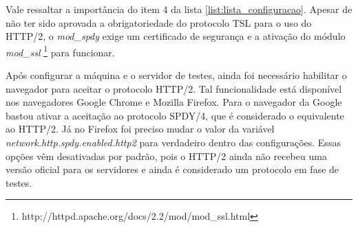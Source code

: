 Vale ressaltar a importância do item 4 da lista \autoref{list:lista_configuracao}. Apesar de não ter sido aprovada a obrigatoriedade do protocolo TSL para o uso do HTTP/2, o \textit{mod\_spdy} exige um certificado de segurança e a ativação do módulo \textit{mod\_ssl} \footnote{http://httpd.apache.org/docs/2.2/mod/mod\_ssl.html} para funcionar.

Após configurar a máquina e o servidor de testes, ainda foi necessário habilitar o navegador para aceitar o protocolo HTTP/2. Tal funcionalidade está disponível nos navegadores Google Chrome e Mozilla Firefox. Para o navegador da Google bastou ativar a aceitação ao protocolo SPDY/4, que é considerado o equivalente ao HTTP/2. Já no Firefox foi preciso mudar o valor da variável \textit{network.http.spdy.enabled.http2} para verdadeiro dentro das configurações. Essas opções vêm desativadas por padrão, pois o HTTP/2 ainda não recebeu uma versão oficial para os servidores e ainda é considerado um protocolo em fase de testes.